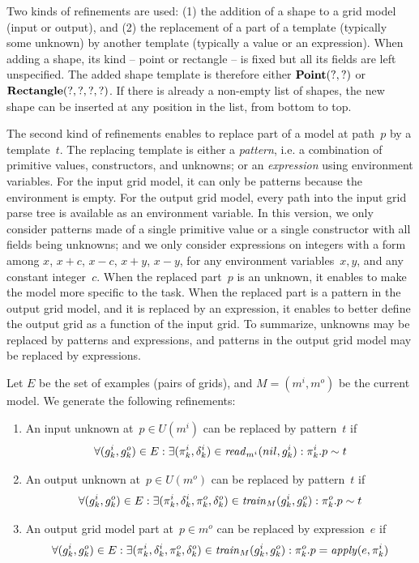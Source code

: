 \documentclass[a4paper]{llncs}
\begin{document}
Two kinds of refinements are used: (1) the addition of a shape to a
grid model (input or output), and (2) the replacement of a part of a
template (typically some unknown) by another template (typically a
value or an expression).
%
When adding a shape, its kind -- point or rectangle -- is fixed but
all its fields are left unspecified. The added shape template is
therefore either ${\bf Point}(?,?)$ or ${\bf Rectangle}(?,?,?,?)$.  If
there is already a non-empty list of shapes, the new shape can be
inserted at any position in the list, from bottom to top.

The second kind of refinements enables to replace part of a model at
path~$p$ by a template~$t$. The replacing template is either a {\em
  pattern}, i.e. a combination of primitive values, constructors, and
unknowns; or an {\em expression} using environment variables. For the
input grid model, it can only be patterns because the environment is
empty. For the output grid model, every path into the input grid parse
tree is available as an environment variable.
%
In this version, we only consider patterns made of a single primitive
value or a single constructor with all fields being unknowns; and we
only consider expressions on integers with a form among $x$, $x+c$,
$x-c$, $x+y$, $x-y$, for any environment variables~$x,y$, and any
constant integer~$c$.
%
When the replaced part~$p$ is an unknown, it enables to make the model
more specific to the task. When the replaced part is a pattern in the
output grid model, and it is replaced by an expression, it enables to
better define the output grid as a function of the input grid. To
summarize, unknowns may be replaced by patterns and expressions, and
patterns in the output grid model may be replaced by expressions.

Let $E$ be the set of examples (pairs of grids), and $M = (m^i,m^o)$
be the current model. We generate the following refinements:
\begin{enumerate}
\item An input unknown at~$p \in U(m^i)$ can be replaced by
  pattern~$t$ if
\[ \forall (g^i_k,g^o_k) \in E: \exists (\pi^i_k,\delta^i_k) \in {\it
    read}_{m^i}(nil,g^i_k): \pi^i_k.p \sim t \]
%
\item An output unknown at~$p \in U(m^o)$ can be replaced by
pattern~$t$ if
\[ \forall (g^i_k,g^o_k) \in E: \exists (\pi^i_k,\delta^i_k,\pi^o_k,\delta^o_k) \in {\it
    train}_M(g^i_k,g^o_k): \pi^o_k.p \sim t \]
%
\item An output grid model part at~$p \in m^o$ can be replaced by expression~$e$ if
\[ \forall (g^i_k,g^o_k) \in E: \exists (\pi^i_k,\delta^i_k,\pi^o_k,\delta^o_k) \in {\it
    train}_M(g^i_k,g^o_k): \pi^o_k.p = {\it apply}(e, \pi^i_k) \]
\end{enumerate}
\end{document}
